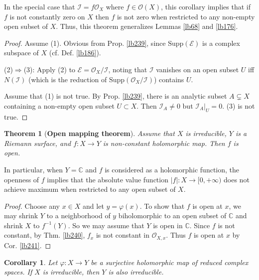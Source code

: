 \documentclass[12pt,b5paper,notitlepage]{report}
\theoremstyle{definition}
\theoremstyle{plain}
\newtheorem{thm}[df]{Theorem}
\newtheorem{co}[df]{Corollary}
\newcommand{\mc}{\mathcal}
\newcommand{\scr}{\mathscr}
\newcommand{\Cbb}{\mathbb C}
\newcommand{\Supp}{\mathrm{Supp}}
\numberwithin{equation}{section}
\begin{document}
In the special case that $\mc I=f\scr O_X$ where $f\in\scr O(X)$, this corollary implies that if $f$ is not constantly zero on $X$ then $f$ is not zero when restricted to any non-empty open subset of $X$. Thus, this theorem generalizes Lemmas \ref{lb68} and \ref{lb176}.


\begin{proof}
Assume (1). Obvious from Prop. \ref{lb239}, since $\Supp(\scr E)$ is a complex subspace of $X$ (cf. Def. \ref{lb186}).

(2)$\Rightarrow$(3): Apply (2) to $\scr E=\scr O_X/\mc I$, noting that $\mc I$ vanishes on an open subset $U$ iff $N(\mc I)$ (which is the reduction of $\Supp(\scr O_X/\mc I)$) contains $U$.

Assume that (1) is not true. By Prop. \ref{lb239}, there is an analytic subset $A\subsetneq X$ containing a non-empty open subset $U\subset X$. Then $\scr I_A\neq 0$ but $\scr I_A|_U=0$. (3) is not true.
\end{proof}


\begin{thm}[\textbf{Open mapping theorem}] \label{lb242} 
Assume that $X$ is irreducible, $Y$ is a Riemann surface, and $f:X\rightarrow Y$ is non-constant holomorphic map. Then $f$ is open. 
\end{thm}

In particular, when $Y=\Cbb$ and $f$ is considered as a holomorphic function,  the openness of $f$ implies that the absolute value function $|f|:X\rightarrow[0,+\infty)$ does not achieve maximum when restricted to any open subset of $X$.

\begin{proof}
Choose any $x\in X$ and let $y=\varphi(x)$. To show that $f$ is open at $x$, we may shrink $Y$ to a neighborhood of $y$ biholomorphic to an open subset of $\Cbb$ and shrink $X$ to $f^{-1}(Y)$. So we may assume that $Y$ is open in $\Cbb$. Since $f$ is not constant, by Thm. \ref{lb240}, $f_x$ is not constant in $\scr O_{X,x}$. Thus $f$ is open at $x$ by Cor. \ref{lb241}. 
\end{proof}















\begin{co}\label{lb244}
Let $\varphi:X\rightarrow Y$ be a surjective holomorphic map of reduced complex spaces. If $X$ is irreducible, then $Y$ is also irreducible. 
\end{co}
\end{document}
